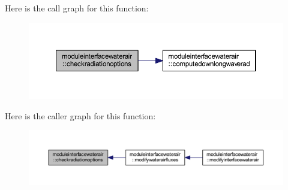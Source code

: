 Here is the call graph for this function\+:\nopagebreak
\begin{figure}[H]
\begin{center}
\leavevmode
\includegraphics[width=350pt]{namespacemoduleinterfacewaterair_a285710ae41f9eb54923e88dfcaf64681_cgraph}
\end{center}
\end{figure}
Here is the caller graph for this function\+:\nopagebreak
\begin{figure}[H]
\begin{center}
\leavevmode
\includegraphics[width=350pt]{namespacemoduleinterfacewaterair_a285710ae41f9eb54923e88dfcaf64681_icgraph}
\end{center}
\end{figure}
\mbox{\label{namespacemoduleinterfacewaterair_a1210cfaa400404020add49f99363970b}} 
